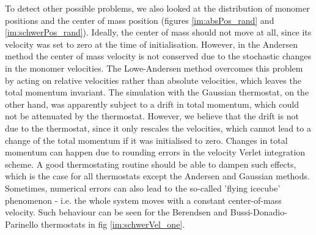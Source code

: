 To detect other possible problems, we also looked at the distribution of monomer positions and the center of mass position (figures \ref{im:absPos_rand} and \ref{im:schwerPos_rand}). Ideally, the center of mass should not move at all, since its velocity was set to zero at the time of initialisation. However, in the Andersen method the center of mass velocity is not conserved due to the stochastic changes in the monomer velocities. The Lowe-Andersen method overcomes this problem by acting on relative velocities rather than absolute velocities, which leaves the total momentum invariant. 
The simulation with the Gaussian thermostat, on the other hand, was apparently subject to a drift in total momentum, which could not be attenuated by the thermostat. However, we believe that the drift is not due to the thermostat, since it only rescales the velocities, which cannot lead to a change of the total momentum if it was initialised to zero. Changes in total momentum can happen due to rounding errors in the velocity Verlet integration scheme. A good thermostating routine should be able to dampen such effects, which is the case for all thermostats except the Andersen and Gaussian methods. 
Sometimes, numerical errors can also lead to the so-called 'flying icecube' phenomenon - i.e. the whole system moves with a constant center-of-mass velocity. Such behaviour can be seen for the Berendsen and Bussi-Donadio-Parinello thermostats in fig \ref{im:schwerVel_one}. 
